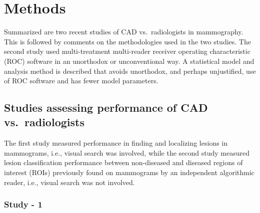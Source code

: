 \documentclass[
]{book}
\begin{document}
\hypertarget{standalone-cad-radiologists-methods}{%
\section{Methods}\label{standalone-cad-radiologists-methods}}

Summarized are two recent studies of CAD vs.~radiologists in mammography. This is followed by comments on the methodologies used in the two studies. The second study used multi-treatment multi-reader receiver operating characteristic (ROC) software in an unorthodox or unconventional way. A statistical model and analysis method is described that avoids unorthodox, and perhaps unjustified, use of ROC software and has fewer model parameters.

\hypertarget{standalone-cad-radiologists-two-previous-studies}{%
\subsection{Studies assessing performance of CAD vs.~radiologists}\label{standalone-cad-radiologists-two-previous-studies}}

The first study \citep{hupse2013standalone} measured performance in finding and localizing lesions in mammograms, i.e., visual search was involved, while the second study \citep{kooi2016comparison} measured lesion classification performance between non-diseased and diseased regions of interest (ROIs) previously found on mammograms by an independent algorithmic reader, i.e., visual search was not involved.

\hypertarget{standalone-cad-radiologists-study1}{%
\subsubsection{Study - 1}\label{standalone-cad-radiologists-study1}}
\end{document}
